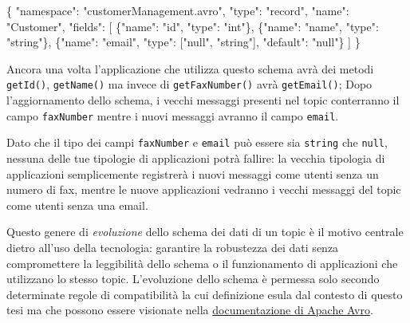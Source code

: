 \documentclass[]{article}
\newenvironment{Shaded}{}{}
\newcommand{\DataTypeTok}[1]{\textcolor[rgb]{0.56,0.13,0.00}{#1}}
\newcommand{\StringTok}[1]{\textcolor[rgb]{0.25,0.44,0.63}{#1}}
\newcommand{\OtherTok}[1]{\textcolor[rgb]{0.00,0.44,0.13}{#1}}
\newcommand{\FunctionTok}[1]{\textcolor[rgb]{0.02,0.16,0.49}{#1}}
\begin{document}
\begin{Shaded}
\begin{Highlighting}[]
\FunctionTok{\{}
    \DataTypeTok{"namespace"}\FunctionTok{:} \StringTok{"customerManagement.avro"}\FunctionTok{,}
    \DataTypeTok{"type"}\FunctionTok{:} \StringTok{"record"}\FunctionTok{,}
    \DataTypeTok{"name"}\FunctionTok{:} \StringTok{"Customer"}\FunctionTok{,}
    \DataTypeTok{"fields"}\FunctionTok{:} \OtherTok{[}
         \FunctionTok{\{}\DataTypeTok{"name"}\FunctionTok{:} \StringTok{"id"}\FunctionTok{,} \DataTypeTok{"type"}\FunctionTok{:} \StringTok{"int"}\FunctionTok{\}}\OtherTok{,}
         \FunctionTok{\{}\DataTypeTok{"name"}\FunctionTok{:} \StringTok{"name"}\FunctionTok{,}  \DataTypeTok{"type"}\FunctionTok{:} \StringTok{"string"}\FunctionTok{\}}\OtherTok{,}
         \FunctionTok{\{}\DataTypeTok{"name"}\FunctionTok{:} \StringTok{"email"}\FunctionTok{,} \DataTypeTok{"type"}\FunctionTok{:} \OtherTok{[}\StringTok{"null"}\OtherTok{,} \StringTok{"string"}\OtherTok{]}\FunctionTok{,} \DataTypeTok{"default"}\FunctionTok{:} \StringTok{"null"}\FunctionTok{\}}
    \OtherTok{]}
\FunctionTok{\}}
\end{Highlighting}
\end{Shaded}

\normalsize

Ancora una volta l'applicazione che utilizza questo schema avrà dei
metodi \texttt{getId()}, \texttt{getName()} ma invece di
\texttt{getFaxNumber()} avrà \texttt{getEmail()}; Dopo l'aggiornamento
dello schema, i vecchi messaggi presenti nel topic conterranno il campo
\texttt{faxNumber} mentre i nuovi messaggi avranno il campo
\texttt{email}.

Dato che il tipo dei campi \texttt{faxNumber} e \texttt{email} può
essere sia \texttt{string} che \texttt{null}, nessuna delle tue
tipologie di applicazioni potrà fallire: la vecchia tipologia di
applicazioni semplicemente registrerà i nuovi messaggi come utenti senza
un numero di fax, mentre le nuove applicazioni vedranno i vecchi
messaggi del topic come utenti senza una email.

Questo genere di \emph{evoluzione} dello schema dei dati di un topic è
il motivo centrale dietro all'uso della tecnologia: garantire la
robustezza dei dati senza compromettere la leggibilità dello schema o il
funzionamento di applicazioni che utilizzano lo stesso topic.
L'evoluzione dello schema è permessa solo secondo determinate regole di
compatibilità la cui definizione esula dal contesto di questo tesi ma
che possono essere visionate nella
\href{https://avro.apache.org/docs/1.7.7/spec.html\#Schema+Resolution}{documentazione
di Apache Avro}.
\end{document}
